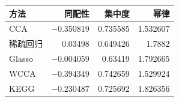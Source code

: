 \begin{table}[htbp]
\centering
{}
\begin{tabular}{lrrr}
\toprule
方法&同配性&集中度&幂律\\
\midrule
CCA&$-0.350819$&0.735585&1.532607\\
稀疏回归&0.03498&0.649426&1.7882\\
Glasso&$-0.004059$&0.63419&1.792665\\
WCCA&$-0.394349$&0.742659&1.529924\\
KEGG&$-0.230487$&0.725692&1.826356\\
\bottomrule
\end{tabular}
\end{table}
